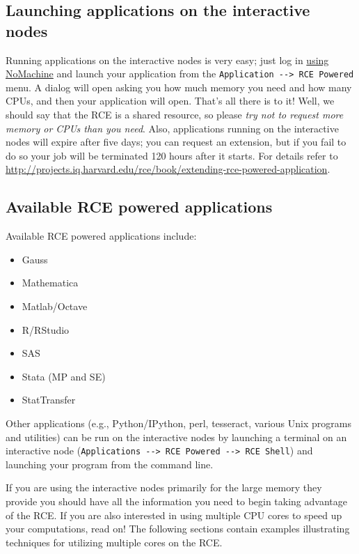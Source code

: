 \documentclass[11pt]{article}
\begin{document}
\subsection{Launching applications on the interactive nodes}
\label{sec:orgbd5cc30}
Running applications on the interactive nodes is very easy; just log in \hyperref[sec:org16009a6]{using NoMachine} and launch your application from the \texttt{Application -{}-> RCE Powered} menu. A dialog will open asking you how much memory you need and how many CPUs, and then your application will open. That's all there is to it! Well, we should say that the RCE is a shared resource, so please \emph{try not to request more memory or CPUs than you need}. Also, applications running on the interactive nodes will expire after five days; you can request an extension, but if you fail to do so your job will be terminated 120 hours after it starts. For details refer to \url{http://projects.iq.harvard.edu/rce/book/extending-rce-powered-application}.

\subsection{Available RCE powered applications}
\label{sec:org34674cd}

Available RCE powered applications include:
\begin{itemize}
\item Gauss
\item Mathematica
\item Matlab/Octave
\item R/RStudio
\item SAS
\item Stata (MP and SE)
\item StatTransfer
\end{itemize}

Other applications (e.g., Python/IPython, perl, tesseract, various Unix programs and utilities) can be run on the interactive nodes by launching a terminal on an interactive node (\texttt{Applications -{}-> RCE Powered -{}-> RCE Shell}) and launching your program from the command line.

If you are using the interactive nodes primarily for the large memory they provide you should have all the information you need to begin taking advantage of the RCE. If you are also interested in using multiple CPU cores to speed up your computations, read on! The following sections contain examples illustrating techniques for utilizing multiple cores on the RCE.
\end{document}
